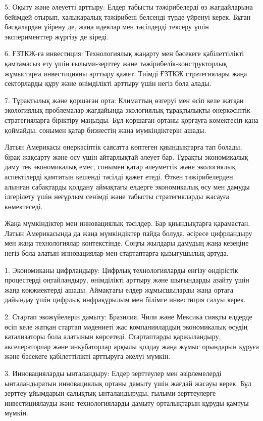 \begin{multicols}{2}
5. Оқыту және әлеуетті арттыру: Елдер табысты тәжірибелерді өз
жағдайларына бейімдей отырып, халықаралық тәжірибені белсенді түрде
үйренуі керек. Бұған басқалардан үйрену де, жаңа идеялар мен тәсілдерді
тексеру үшін эксперименттер жүргізу де кіреді.

6. ҒЗТКЖ-ға инвестиция: Технологиялық жаңарту мен бәсекеге
қабілеттілікті қамтамасыз ету үшін ғылыми-зерттеу және
тәжірибелік-конструкторлық жұмыстарға инвестицияны арттыру қажет. Тиімді
ҒЗТКЖ стратегиялары жаңа секторларды құру және өнімділікті арттыру үшін
негіз бола алады.

7. Тұрақтылық және қоршаған орта: Климаттың өзгеруі мен өсіп келе жатқан
экологиялық проблемалар жағдайында экологиялық тұрақтылықты өнеркәсіптік
стратегияларға біріктіру маңызды. Бұл қоршаған ортаны қорғауға
көмектесіп қана қоймайды, сонымен қатар бизнестің жаңа мүмкіндіктерін
ашады.

Латын Америкасы өнеркәсіптік саясатта көптеген қиындықтарға тап болады,
бірақ жақсарту және өсу үшін айтарлықтай әлеует бар. Тұрақты
экономикалық даму тек экономикалық емес, сонымен қатар әлеуметтік және
экологиялық аспектілерді қамтитын кешенді тәсілді қажет етеді. Өткен
тәжірибелерден алынған сабақтарды қолдану аймақтағы елдерге экономикалық
өсу мен дамуды ілгерілету үшін неғұрлым сенімді және табысты
стратегияларды жасауға көмектеседі.

Жаңа мүмкіндіктер мен инновациялық тәсілдер. Бар қиындықтарға
қарамастан, Латын Америкасында да жаңа мүмкіндіктер пайда болуда,
әсіресе цифрландыру мен жаңа технологиялар контекстінде. Соңғы жылдары
дамудың жаңа кезеңіне негіз бола алатын инновациялар мен стартаптарға
қызығушылық артуда.

1. Экономиканы цифрландыру: Цифрлық технологияларды енгізу өндірістік
процестерді оңтайландыру, өнімділікті арттыру және шығындарды азайту
үшін жаңа көкжиектерді ашады. Аймақтағы елдер жұмысшыларды жаңа ортаға
дайындау үшін цифрлық инфрақұрылым мен білімге инвестиция салуы керек.

2. Стартап экожүйелерін дамыту: Бразилия, Чили және Мексика сияқты
елдерде өсіп келе жатқан стартап мәдениеті жас компаниялардың
экономикалық өсудің катализаторы бола алатынын көрсетеді. Стартаптарды
қаржыландыру, акселераторлар және инкубаторлар арқылы қолдау жаңа жұмыс
орындарын құруға және бәсекеге қабілеттілікті арттыруға әкелуі мүмкін.

3. Инновацияларды ынталандыру: Елдер зерттеулер мен әзірлемелерді
ынталандыратын инновациялық ортаны дамыту үшін жағдай жасауы керек. Бұл
зерттеу ұйымдарын салықтық ынталандыруды, ғылыми зерттеулерге
инвестициялауды және технологияларды дамыту орталықтарын құруды қамтуы
мүмкін.


\end{multicols}
